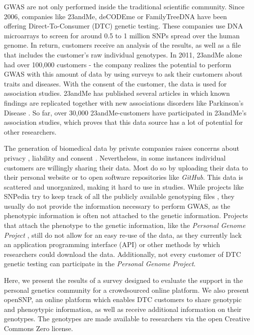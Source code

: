 \documentclass[10pt]{article}
\begin{document}
GWAS are not only performed inside the traditional scientific community. 
Since 2006, companies like 23andMe, deCODEme or FamilyTreeDNA have been offering Direct-To-Consumer (DTC) genetic testing. 
These companies use DNA microarrays to screen for around 0.5 to 1 million SNPs spread over the human genome. In return, customers 
receive an analysis of the results, as well as a file that includes the customer's raw individual genotypes. In 2011, 23andMe 
alone had over 100,000 customers \cite{23andMe2011}
- the company realizes the potential to perform GWAS with this amount of data by using surveys to ask their customers about 
traits and diseases. With the consent of the customer, the data is used for association studies. 23andMe has published several 
articles in which known findings are replicated together with new associations disorders like Parkinson's Disease \cite{Eriksson2010, Do2011}. 
So far, over 30,000 23andMe-customers have participated in 23andMe's association studies, which proves that this data source has a lot of potential for other researchers.

The generation of biomedical data by private companies raises concerns about privacy \cite{23andMe2012}, 
liability and consent \cite{Caulfield2011}. 
Nevertheless, in some instances individual customers are willingly sharing their data. Most do so by uploading their data to
their personal website or to open software repositories like \textit{GitHub}. 
This data is scattered and unorganized, making it hard to use in studies. While projects like SNPedia try to keep track of all 
the publicly available genotyping files \cite{Cariaso2011}, they usually do not provide the information necessary to perform GWAS, as the phenotypic information is 
often not attached to the genetic information. Projects that attach the phenotype to the genetic information, 
like the \textit{Personal Genome Project} \cite{Ball24072012}, still do not allow for an easy re-use of the data, as they currently lack an application programming interface (API) 
or other methods by which researchers could download the data. Additionally, not every customer of DTC genetic testing can participate in the \textit{Personal Genome Project}.  

Here, we present the results of a survey designed to evaluate the support in the personal genetics community for a crowdsourced online platform. We also present openSNP, an online platform which enables DTC customers to share genotypic and phenoytypic information, as well as receive additional information on their genotypes. The genotypes are made available to researchers via the open Creative Commons Zero license.
\end{document}
